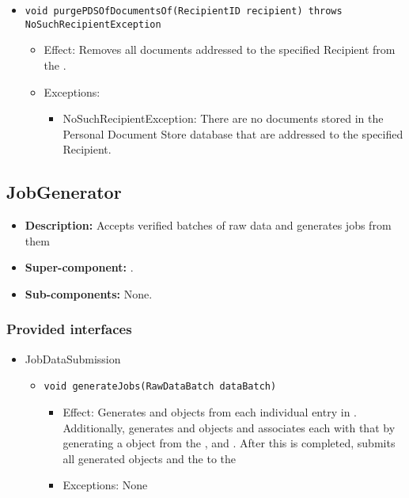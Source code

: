 \begin{itemize}
\begin{itemize}
		\item \texttt{void purgePDSOfDocumentsOf(RecipientID recipient) throws NoSuchRecipientException}
		\begin{itemize}
			\item Effect: Removes all documents addressed to the specified Recipient from the .
			\item Exceptions:
			\begin{itemize}
				\item NoSuchRecipientException: There are no documents stored in the Personal Document Store database that are addressed to the specified Recipient.
			\end{itemize}
		\end{itemize}
	\end{itemize}
\end{itemize}

\subsection{JobGenerator}
\begin{itemize}
	\item \textbf{Description:} Accepts verified batches of raw data and generates jobs from them
	\item \textbf{Super-component:} .
	\item \textbf{Sub-components:} None.
\end{itemize}

\subsubsection*{Provided interfaces}
\begin{itemize}
	\item JobDataSubmission
	\begin{itemize}
		\item \texttt{void generateJobs(RawDataBatch dataBatch)}
		\begin{itemize}
			\item Effect: Generates  and  objects from each individual entry in . Additionally, generates  and  objects and associates each  with that  by generating a  object from the ,  and . After this is completed, submits all generated  objects and the  to the 
			\item Exceptions: None
		\end{itemize}
	\end{itemize}
\end{itemize}

